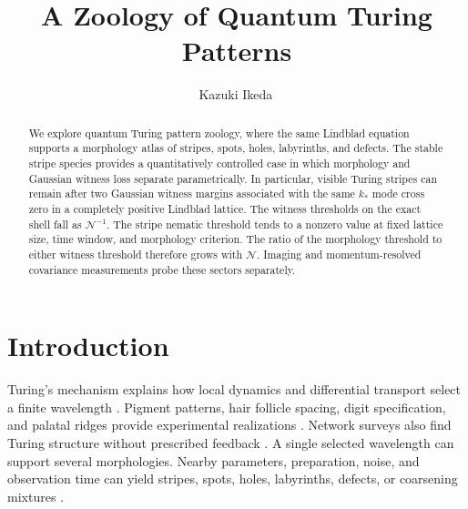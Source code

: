 \documentclass[aps,prl,twocolumn,superscriptaddress,nofootinbib,floatfix]{revtex4-2}
\newcommand{\cN}{\mathcal N}
\begin{document}
\title{A Zoology of Quantum Turing Patterns}
\author{Kazuki Ikeda\,}


\begin{abstract}
We explore quantum Turing pattern zoology, where the same Lindblad equation supports a morphology atlas of stripes, spots, holes, labyrinths, and defects. The stable stripe species provides a quantitatively controlled case in which morphology and Gaussian witness loss separate parametrically. In particular, visible Turing stripes can remain after two Gaussian witness margins associated with the same $k_*$ mode cross zero in a completely positive Lindblad lattice. The witness thresholds on the exact shell fall as $\cN^{-1}$. The stripe nematic threshold tends to a nonzero value at fixed lattice size, time window, and morphology criterion. The ratio of the morphology threshold to either witness threshold therefore grows with $\cN$. Imaging and momentum-resolved covariance measurements probe these sectors separately.
\end{abstract}
\maketitle

\section{Introduction}
Turing's mechanism explains how local dynamics and differential transport select a finite wavelength \cite{Turing1952,CrossHohenberg1993,CrossGreenside2009,GiererMeinhardt1972,MainiPainterChau1997,KondoMiura2010,Krause2021}. Pigment patterns, hair follicle spacing, digit specification, and palatal ridges provide experimental realizations \cite{KondoAsai1995,KondoWatanabeMiyazawa2021,YamaguchiYoshimotoKondo2007,NakamasuTakahashiKanbeKondo2009,SickReinkerTimmerSchlake2006,RaspopovicMarconRussoSharpe2014,EconomouEtAl2012}. Network surveys also find Turing structure without prescribed feedback \cite{PaulAdetunjiHong2024}. A single selected wavelength can support several morphologies. Nearby parameters, preparation, noise, and observation time can yield stripes, spots, holes, labyrinths, defects, or coarsening mixtures \cite{Hoyle2006,Leppanen2004,GuiuSouto2012,Bray1994}.
\end{document}
